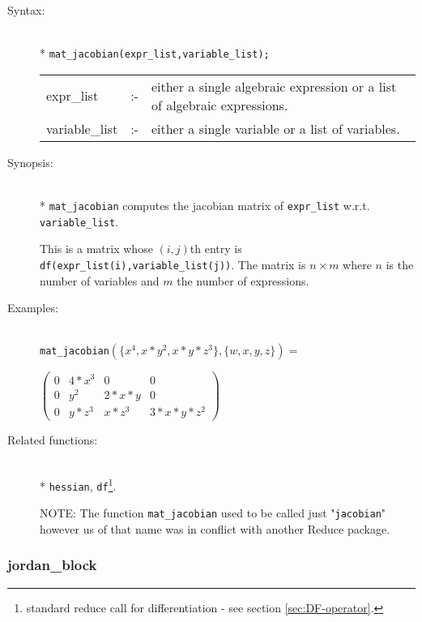 \begin{description}
\item[Syntax:]\mbox{}\\*
\texttt{mat\_jacobian(expr\_list,variable\_list);}\\[2mm]
\begin{tabular}{l l p{.72\linewidth}}
expr\_list  &:-& either a
single algebraic expression or a list of algebraic expressions.\\
variable\_list &:-& either a single variable or a list of variables.
\end{tabular}

\item[Synopsis:]\mbox{}\\*
\texttt{mat\_jacobian} computes the jacobian matrix of \texttt{expr\_list} w.r.t.
\texttt{variable\_list}.

This is a matrix whose $(i,j)$th entry
is \texttt{df(expr\_list(i),variable\_list(j))}.  The matrix is $n\times m$
where $n$ is the number of variables and $m$ the number of expressions.

\item[Examples:]\mbox{}\\
  \texttt{mat\_jacobian}\((\{x^4,x*y^2,x*y*z^3\},\{w,x,y,z\}) =\)

  \(\begin{pmatrix} 0 & 4*x^3 & 0 & 0 \\ 0 & y^2 & 2*x*y & 0 \\
  0 & y*z^3 & x*z^3 & 3*x*y*z^2
  \end{pmatrix}\)

\item[Related functions:]\mbox{}\\*
\texttt{hessian}, \texttt{df}\footnote{standard reduce call
for differentiation - see section \protect\ref{sec:DF-operator}.}.

NOTE: The function \texttt{mat\_jacobian} used to be called just "\texttt{jacobian}"
however us of that name was in conflict with another Reduce package.
\end{description}


\subsubsection{jordan\_block}
\label{linalg:jordan_block}

